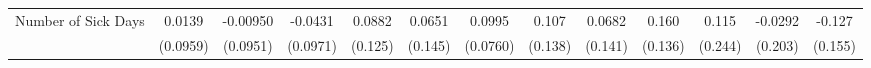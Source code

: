 {\begin{tabular}{l*{12}{c}}
\addlinespace
Number of Sick Days&      0.0139         &    -0.00950         &     -0.0431         &      0.0882         &      0.0651         &      0.0995         &       0.107         &      0.0682         &       0.160         &       0.115         &     -0.0292         &      -0.127         \\
            &    (0.0959)         &    (0.0951)         &    (0.0971)         &     (0.125)         &     (0.145)         &    (0.0760)         &     (0.138)         &     (0.141)         &     (0.136)         &     (0.244)         &     (0.203)         &     (0.155)         \\
\bottomrule
\end{tabular}
}
